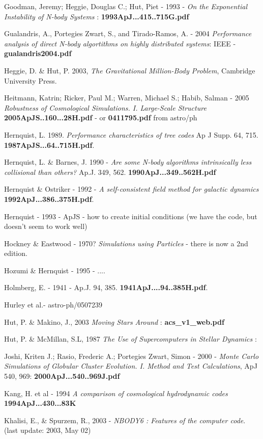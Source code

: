 Goodman, Jeremy; Heggie, Douglas C.; Hut, Piet - 1993 -
{\it On the Exponential Instability of N-body Systems} :
{\bf 1993ApJ...415..715G.pdf}

Gualandris, A., Portegies Zwart, S., and Tirado-Ramos, A. - 2004
{\it Performance analysis of direct N-body algortithms on highly distributed systems}:
IEEE - {\bf gualandris2004.pdf}

Heggie, D. \& Hut, P. 2003, 
{\it The Gravitational Million-Body Problem}, 
Cambridge University Press.

Heitmann, Katrin; Ricker, Paul M.; Warren, Michael S.; Habib, Salman - 2005
{\it Robustness of Cosmological Simulations. I. Large-Scale Structure}
{\bf 2005ApJS..160...28H.pdf} - or {\bf 0411795.pdf} from astro/ph

Hernquist, L. 1989. {\it Performance characteristics of tree codes} Ap J Supp. 64, 715.
{\bf 1987ApJS...64..715H.pdf}.

Hernquist, L. \& Barnes, J. 1990 - 
{\it Are some N-body algorithms intrinsically less collisional than others?}
Ap.J. 349,  562. {\bf 1990ApJ...349..562H.pdf}

Hernquist \& Ostriker - 1992 - {\it A self-consistent field method for galactic dynamics}
{\bf 1992ApJ...386..375H.pdf}.

Hernquist - 1993 - ApJS - how to create initial conditions (we have the code, but doesn't
seem to work well)

Hockney \& Eastwood - 1970? {\it Simulations using Particles} - there is now a 2nd edition.

Hozumi \& Hernquist - 1995 - ....

Holmberg, E. - 1941 - Ap.J. 94, 385.
{\bf 1941ApJ....94..385H.pdf}.

Hurley et al.- astro-ph/0507239

Hut, P. \& Makino, J., 2003  {\it Moving Stars Around} :
{\bf acs\_v1\_web.pdf}

Hut, P. \& McMillan, S.L, 1987  {\it The Use of Supercomputers in Stellar Dynamics} :

Joshi, Kriten J.; Rasio, Frederic A.; Portegies Zwart, Simon - 2000 -
{\it Monte Carlo Simulations of Globular Cluster Evolution. I. Method and Test Calculations},
ApJ 540, 969: 
{\bf 2000ApJ...540..969J.pdf}

Kang, H. et al - 1994
{\it A comparison of cosmological hydrodynamic codes}
{\bf 1994ApJ...430...83K}

Khalisi, E., \& Spurzem, R., 2003 - {\it NBODY6 : Features of the computer code}.
(last update: 2003, May 02)

